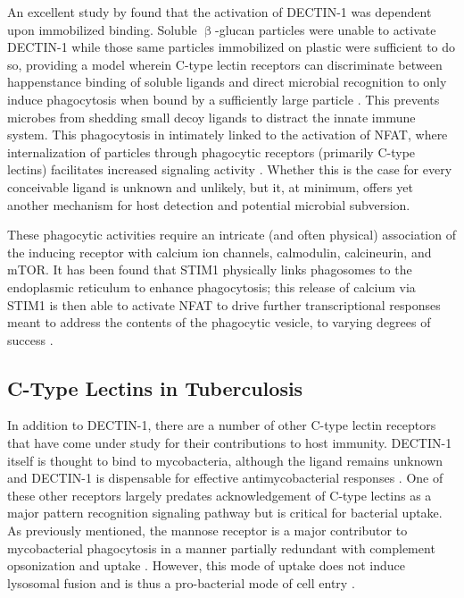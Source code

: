 An excellent study by \citet{Goodridge2011} found that the activation of DECTIN\hyp{}1 was dependent upon immobilized binding. Soluble $\upbeta$\hyp{}glucan particles were unable to activate DECTIN\hyp{}1 while those same particles immobilized on plastic were sufficient to do so, providing a model wherein C\hyp{}type lectin receptors can discriminate between happenstance binding of soluble ligands and direct microbial recognition to only induce phagocytosis when bound by a sufficiently large particle \citep{Elder2017}. This prevents microbes from shedding small decoy ligands to distract the innate immune system. This phagocytosis in intimately linked to the activation of NFAT, where internalization of particles through phagocytic receptors (primarily C\hyp{}type lectins) facilitates increased signaling activity \citep{Fric2014}. Whether this is the case for every conceivable ligand is unknown and unlikely, but it, at minimum, offers yet another mechanism for host detection and potential microbial subversion.

These phagocytic activities require an intricate (and often physical) association of the inducing receptor with calcium ion channels, calmodulin, calcineurin, and mTOR. It has been found that STIM1 physically links phagosomes to the endoplasmic reticulum to enhance phagocytosis; this release of calcium via STIM1 is then able to activate NFAT to drive further transcriptional responses meant to address the contents of the phagocytic vesicle, to varying degrees of success \citep{Nunes2012}.

\subsection{C\hyp{}Type Lectins in Tuberculosis}

In addition to DECTIN\hyp{}1, there are a number of other C\hyp{}type lectin receptors that have come under study for their contributions to host immunity. DECTIN\hyp{}1 itself is thought to bind to mycobacteria, although the ligand remains unknown and DECTIN\hyp{}1 is dispensable for effective antimycobacterial responses \citep{Yadav2006, Schorey2008, Rothfuchs2007, Marakalala2011}. One of these other receptors largely predates acknowledgement of C\hyp{}type lectins as a major pattern recognition signaling pathway but is critical for bacterial uptake. As previously mentioned, the mannose receptor is a major contributor to mycobacterial phagocytosis in a manner partially redundant with complement opsonization and uptake \citep{Schlesinger1993, Kang1998b}. However, this mode of uptake does not induce lysosomal fusion and is thus a pro\hyp{}bacterial mode of cell entry \citep{AstarieDequeker1999, Goyal2016, Rajaram2017}. 

